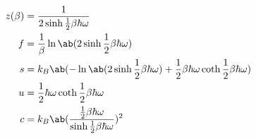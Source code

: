 \documentclass[uplatex,diffipdfmx,a4paper,11pt]{jlreq}
\numberwithin{equation}{section}
\theoremstyle{definition}
\begin{document}
\begin{theorem}
  \begin{align}
    z(\beta) & = \frac{1}{2\sinh \frac{1}{2}\beta\hbar\omega}                                                                     \\
    f        & = \frac{1}{\beta}\ln\ab(2\sinh \frac{1}{2}\beta\hbar\omega)                                                        \\
    s        & = k_B\ab(-\ln\ab(2\sinh\frac{1}{2}\beta\hbar\omega) + \frac{1}{2}\beta\hbar\omega\coth\frac{1}{2}\beta\hbar\omega) \\
    u        & = \frac{1}{2}\hbar\omega\coth\frac{1}{2}\beta\hbar\omega                                                           \\
    c        & = k_B\ab(\frac{\frac{1}{2}\beta\hbar\omega}{\sinh\frac{1}{2}\beta\hbar\omega})^2
  \end{align}
\end{theorem}
\end{document}
